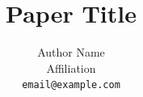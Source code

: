 \documentclass[twocolumn]{article}
\title{Paper Title}
\author{%
  Author Name \\
  Affiliation \\
  \texttt{email@example.com}
}
\theoremstyle{definition}
\theoremstyle{remark}
\begin{document}
\maketitle

\begin{abstract}

\end{abstract}






% 

% 




\appendix
\onecolumn

\end{document}
